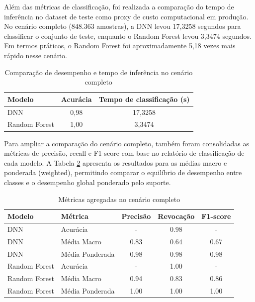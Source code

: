 \documentclass[12pt,oneside]{abntex2}
\begin{document}
Além das métricas de classificação, foi realizada a comparação do tempo de inferência no dataset de teste como proxy de custo computacional em produção. No cenário completo (848.363 amostras), a DNN levou 17,3258 segundos para classificar o conjunto de teste, enquanto o Random Forest levou 3,3474 segundos. Em termos práticos, o Random Forest foi aproximadamente 5,18 vezes mais rápido nesse cenário.

\begin{table}[H]
\centering
\small
\label{tab:comparacao_completo}
\begin{tabular}{lcc}
  \toprule
  \textbf{Modelo} & \textbf{Acurácia} & \textbf{Tempo de classificação (s)} \\
  \midrule
  DNN & 0,98 & 17,3258 \\
  Random Forest & 1,00 & 3,3474 \\
  \bottomrule
\end{tabular}
\caption{Comparação de desempenho e tempo de inferência no cenário completo}
\end{table}

Para ampliar a comparação do cenário completo, também foram consolidadas as métricas de precisão, recall e F1-score com base no relatório de classificação de cada modelo. A Tabela \ref{tab:metricas_completo} apresenta os resultados para as médias macro e ponderada (weighted), permitindo comparar o equilíbrio de desempenho entre classes e o desempenho global ponderado pelo suporte.

\begin{table}[H]
\centering
\small
\label{tab:metricas_completo}
\begin{tabular}{llccc}
  \toprule
  \textbf{Modelo} & \textbf{Métrica} & \textbf{Precisão} & \textbf{Revocação} & \textbf{F1-score} \\
  \midrule
  DNN & Acurácia & - & 0.98 & - \\
  DNN & Média Macro & 0.83 & 0.64 & 0.67 \\
  DNN & Média Ponderada & 0.98 & 0.98 & 0.98 \\
  \midrule
  Random Forest & Acurácia & - & 1.00 & - \\
  Random Forest & Média Macro & 0.94 & 0.83 & 0.86 \\
  Random Forest & Média Ponderada & 1.00 & 1.00 & 1.00 \\
  \bottomrule
\end{tabular}
\caption{Métricas agregadas no cenário completo}
\end{table}
\end{document}
